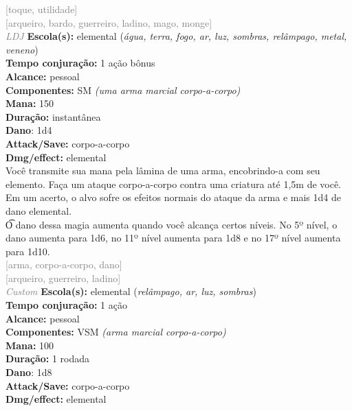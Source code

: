 \documentclass{RPG_Adventure}[2021/10/20]
\begin{document}
{\scriptsize \textcolor{gray}{[toque, utilidade]\\}}
{\scriptsize \textcolor{gray}{[arqueiro, bardo, guerreiro, ladino, mago, monge]\\}}
{\tiny \textcolor{gray}{\textit{LDJ}}}
{\small \t \textbf{Escola(s):} elemental (\textit{água, terra, fogo, ar, luz, sombras, relâmpago, metal, veneno})\\\t \textbf{Tempo conjuração:} 1 ação bônus\\\t \textbf{Alcance:} pessoal\\\t \textbf{Componentes:} SM \textit{(uma arma marcial corpo-a-corpo)}\\\t \textbf{Mana:} 150\\\t \textbf{Duração:} instantânea\\\t \textbf{Dano}: 1d4\\\t \textbf{Attack/Save:} corpo-a-corpo\\\t \textbf{Dmg/effect:} elemental\\}
{\normalsize Você transmite sua mana pela lâmina de uma arma, encobrindo-a com seu elemento. Faça um ataque corpo-a-corpo contra uma criatura até 1,5m de você. Em um acerto, o alvo sofre os efeitos normais do ataque da arma e mais 1d4 de dano elemental.\\\t O dano dessa magia aumenta quando você alcança certos níveis. No 5º nível, o dano aumenta para 1d6, no 11º nível aumenta para 1d8 e no 17º nível aumenta para 1d10.\\}
{\scriptsize \textcolor{gray}{[arma, corpo-a-corpo, dano]\\}}
{\scriptsize \textcolor{gray}{[arqueiro, guerreiro, ladino]\\}}
{\tiny \textcolor{gray}{\textit{Custom}}}
{\small \t \textbf{Escola(s):} elemental (\textit{relâmpago, ar, luz, sombras})\\\t \textbf{Tempo conjuração:} 1 ação\\\t \textbf{Alcance:} pessoal\\\t \textbf{Componentes:} VSM \textit{(arma marcial corpo-a-corpo)}\\\t \textbf{Mana:} 100\\\t \textbf{Duração:} 1 rodada\\\t \textbf{Dano}: 1d8\\\t \textbf{Attack/Save:} corpo-a-corpo\\\t \textbf{Dmg/effect:} elemental\\}
\end{document}
